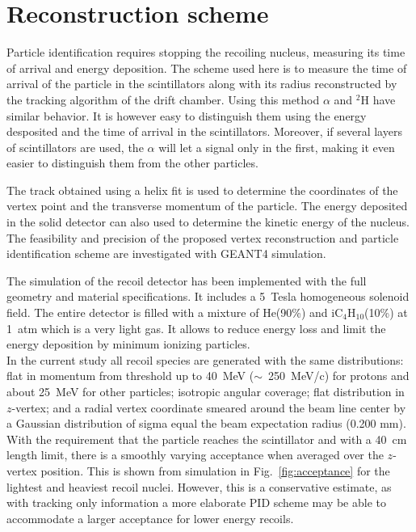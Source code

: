 \section{Reconstruction scheme} \label{sec:sim}

Particle identification requires stopping the recoiling nucleus, measuring its time of arrival and energy deposition. The scheme used here is to measure the time of arrival of the particle in the scintillators along with its radius reconstructed by the tracking algorithm of the drift chamber. Using this method $\alpha$ and $^2$H have similar behavior. It is however easy to distinguish them using the energy desposited and the time of arrival in the scintillators. Moreover, if several layers of scintillators are used, the $\alpha$ will let a signal only in the first, making it even easier to distinguish them from the other particles. 

The track obtained using a helix fit is used to determine the coordinates of the vertex point and the transverse momentum of the particle. The energy deposited in the solid detector can also used to determine the kinetic energy of the nucleus. The feasibility and precision of the proposed vertex reconstruction and particle identification scheme are investigated with GEANT4 simulation.

The simulation of the recoil detector has been implemented with the full geometry and material specifications. It includes a 5~Tesla homogeneous solenoid field. The entire detector is filled with a mixture of He(90\%) and iC$_4$H$_{10}$(10\%) at 1~atm which is a very light gas. It allows to reduce energy loss and limit the energy deposition by minimum ionizing particles.  \\

In the current study all recoil species are generated with the same distributions: flat in momentum from threshold up to 40~MeV ($\sim$~250~MeV/c) for protons and about 25~MeV for other particles; isotropic angular coverage; flat distribution in $z$-vertex; and a radial vertex coordinate smeared around the beam line center by a Gaussian distribution of sigma equal the beam expectation radius (0.200 mm). \\

With the requirement that the particle reaches the scintillator and with a 40~cm length limit, there is a smoothly varying acceptance when averaged over the $z$-vertex position. This is shown from simulation in Fig.~\ref{fig:acceptance} for the lightest and heaviest recoil nuclei. However, this is a conservative estimate, as with tracking only information a more elaborate PID scheme may be able to accommodate a larger acceptance for lower energy recoils.\\

